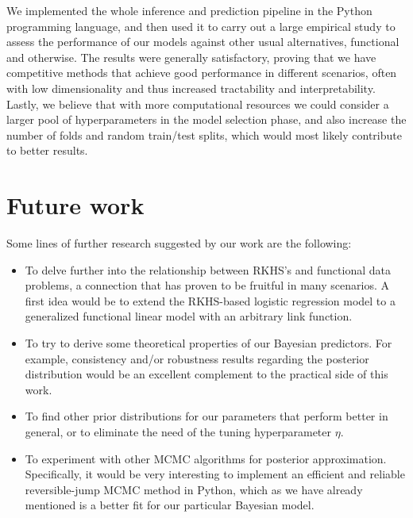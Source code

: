 We implemented the whole inference and prediction pipeline in the Python programming language, and then used it to carry out a large empirical study to assess the performance of our models against other usual alternatives, functional and otherwise. The results were generally satisfactory, proving that we have competitive methods that achieve good performance in different scenarios, often with low dimensionality and thus increased tractability and interpretability. Lastly, we believe that with more computational resources we could consider a larger pool of hyperparameters in the model selection phase, and also increase the number of folds and random train/test splits, which would most likely contribute to better results.

\section{Future work}

Some lines of further research suggested by our work are the following:

\begin{itemize}
  \item To delve further into the relationship between RKHS's and functional data problems, a connection that has proven to be fruitful in many scenarios. A first idea would be to extend the RKHS-based logistic regression model to a generalized functional linear model with an arbitrary link function.
  \item To try to derive some theoretical properties of our Bayesian predictors. For example, consistency and/or robustness results regarding the posterior distribution would be an excellent complement to the practical side of this work.
  \item To find other prior distributions for our parameters that perform better in general, or to eliminate the need of the tuning hyperparameter \(\eta\).
  \item To experiment with other MCMC algorithms for posterior approximation. Specifically, it would be very interesting to implement an efficient and reliable reversible-jump MCMC method in Python, which as we have already mentioned is a better fit for our particular Bayesian model.
\end{itemize}
